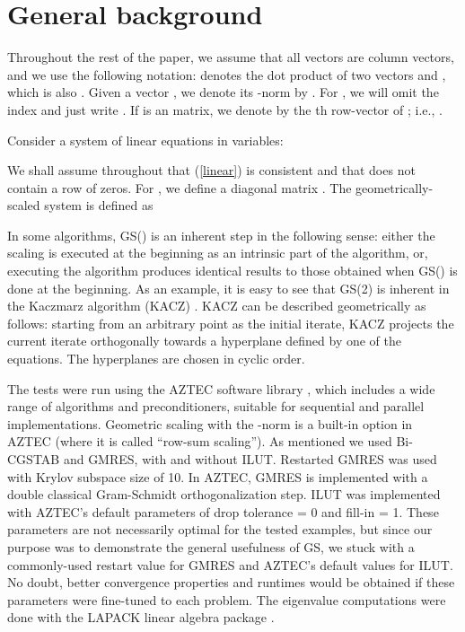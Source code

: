 \documentclass[12pt,a4paper]{article}
\newcounter{i}
\begin{document}
\section{General background}
\label{back}

Throughout the rest of the paper, we assume that all vectors are column
vectors, and we use the following notation:   
denotes the dot product of two vectors  and , which is also 
.  Given a vector , we denote 
its -norm by .  
For , we will omit the index and just write 
.
If  is an  matrix, we denote by  the th 
row-vector of ; i.e., .  

Consider a system of  linear equations in  variables:


We shall assume throughout that (\ref{linear}) is consistent and that 
 does not contain a row of zeros.  For , we define a diagonal 
matrix .  The 
geometrically-scaled system is defined as 


In some algorithms, GS() is an inherent step in the following 
sense: either the scaling is executed at the beginning as an 
intrinsic part of the algorithm, or, executing the algorithm 
produces identical results to those obtained when GS() is 
done at the beginning.  As an example, it is easy to see that 
GS(2) is inherent in the Kaczmarz algorithm (KACZ) 
\cite{Kaczmarz37}.  KACZ can be described geometrically as 
follows: starting from an arbitrary point  
as the initial iterate, KACZ projects the current iterate 
orthogonally towards a hyperplane defined by one of the 
equations.  The hyperplanes are chosen in cyclic order.  

The tests were run using the AZTEC software library \cite{Tuminaro99}, 
which includes a wide range of algorithms and preconditioners, suitable 
for sequential and parallel implementations.  Geometric scaling with 
the -norm is a built-in option in AZTEC (where it is called 
``row-sum scaling'').  As mentioned we used Bi-CGSTAB and GMRES, 
with and without ILUT.  Restarted GMRES was used with Krylov 
subspace size of 10.  In AZTEC, GMRES is implemented with a double 
classical Gram-Schmidt orthogonalization step.  ILUT was implemented 
with AZTEC's default parameters of drop tolerance = 0 and fill-in = 1.  
These parameters are not necessarily optimal for the tested examples, 
but since our purpose was to demonstrate the general usefulness of GS, 
we stuck with a commonly-used restart value for GMRES and AZTEC's 
default values for ILUT.  No doubt, better convergence properties and 
runtimes would be obtained if these parameters were fine-tuned to each 
problem.  The eigenvalue computations were done with the LAPACK linear 
algebra package \cite{lapack}.
\end{document}
